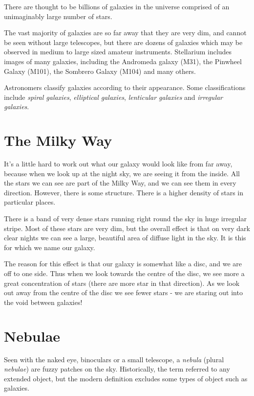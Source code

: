 There are thought to be billions of galaxies in the universe comprised
of an unimaginably large number of stars.

The vast majority of galaxies are so far away that they are very dim,
and cannot be seen without large telescopes, but there are dozens of
galaxies which may be observed in medium to large sized amateur
instruments. Stellarium includes images of many galaxies, including the
Andromeda galaxy (M31), the Pinwheel Galaxy (M101), the Sombrero Galaxy
(M104) and many others.

Astronomers classify galaxies according to their appearance. Some
classifications include \emph{spiral galaxies}, \emph{elliptical
galaxies}, \emph{lenticular galaxies} and \emph{irregular galaxies}.

\section{The Milky Way}\label{the-milky-way}

It's a little hard to work out what our galaxy would look like from far
away, because when we look up at the night sky, we are seeing it from
the inside. All the stars we can see are part of the Milky Way, and we
can see them in every direction. However, there is some structure. There
is a higher density of stars in particular places.

There is a band of very dense stars running right round the sky in huge
irregular stripe. Most of these stars are very dim, but the overall
effect is that on very dark clear nights we can see a large, beautiful
area of diffuse light in the sky. It is this for which we name our
galaxy.

The reason for this effect is that our galaxy is somewhat like a disc,
and we are off to one side. Thus when we look towards the centre of the
disc, we see more a great concentration of stars (there are more star in
that direction). As we look out away from the centre of the disc we see
fewer stars - we are staring out into the void between galaxies!

\section{Nebulae}\label{nebulae}

Seen with the naked eye, binoculars or a small telescope, a
\emph{nebula} (plural \emph{nebulae}) are fuzzy patches on the sky.
Historically, the term referred to any extended object, but the modern
definition excludes some types of object such as galaxies.

